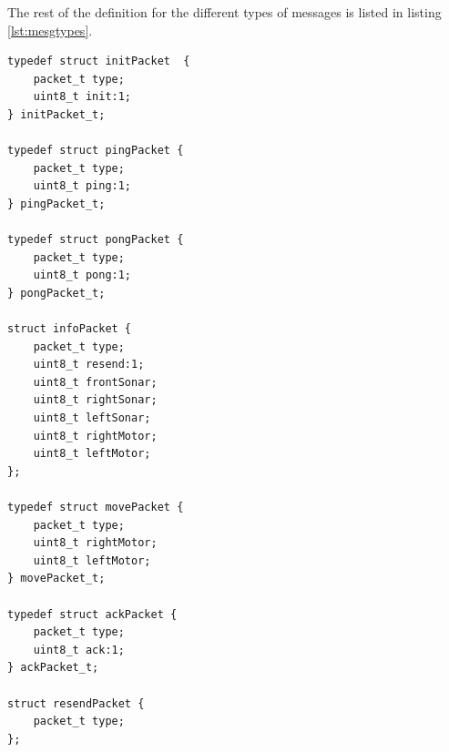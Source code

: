 The rest of the definition for the different types of messages is listed in
listing \ref{lst:mesgtypes}.
\begin{lstlisting}[label=lst:mesgtypes,float,
                   caption={Message Types Definitions}]
typedef struct initPacket  {
    packet_t type;
    uint8_t init:1;
} initPacket_t;

typedef struct pingPacket {
    packet_t type;
    uint8_t ping:1;
} pingPacket_t;

typedef struct pongPacket {
    packet_t type;
    uint8_t pong:1;
} pongPacket_t;

struct infoPacket {
    packet_t type;
    uint8_t resend:1;
    uint8_t frontSonar;
    uint8_t rightSonar;
    uint8_t leftSonar;
    uint8_t rightMotor;
    uint8_t leftMotor;
};

typedef struct movePacket {
    packet_t type;
    uint8_t rightMotor;
    uint8_t leftMotor;
} movePacket_t;

typedef struct ackPacket {
    packet_t type;
    uint8_t ack:1;
} ackPacket_t;

struct resendPacket {
    packet_t type;
};
\end{lstlisting}

